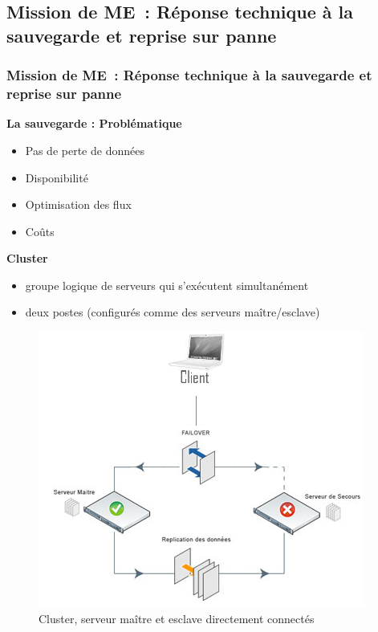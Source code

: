 
\subsection{Mission de ME~: Réponse technique à la sauvegarde et reprise sur panne}
\begin{frame}
\frametitle{Mission de ME~: Réponse technique à la sauvegarde et reprise sur panne}
\begin{block}{\textbf{La sauvegarde : Problématique}}
\begin{itemize}
\item Pas de perte de données
\item Disponibilité
\item Optimisation des flux
\item Coûts
\end{itemize}
\end{block}
\begin{block}{\textbf{Cluster}}
\begin{itemize}
\item groupe logique de serveurs qui s'exécutent simultanément
\item deux postes (configurés comme des serveurs maître/esclave)
\end{itemize}
\end{block}
\end{frame}

\begin{figure}[htbp]
	\centering
	\includegraphics[scale=0.7]{Images/SchemaCluster.png}
	\caption{Cluster, serveur maître et esclave directement connectés}
	\label{SchemaCluster}
\end{figure}

